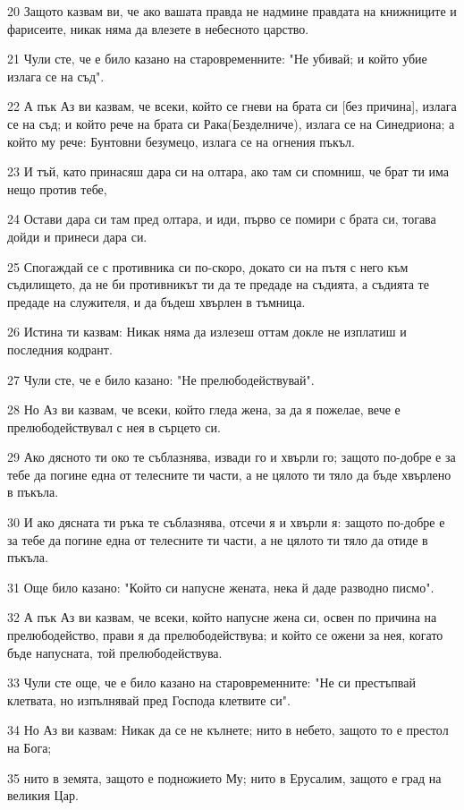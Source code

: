 \par 20 Защото казвам ви, че ако вашата правда не надмине правдата на книжниците и фарисеите, никак няма да влезете в небесното царство.
\par 21 Чули сте, че е било казано на старовременните: "Не убивай; и който убие излага се на съд".
\par 22 А пък Аз ви казвам, че всеки, който се гневи на брата си [без причина], излага се на съд; и който рече на брата си Рака(Безделниче), излага се на Синедриона; а който му рече: Бунтовни безумецо, излага се на огнения пъкъл.
\par 23 И тъй, като принасяш дара си на олтара, ако там си спомниш, че брат ти има нещо против тебе,
\par 24 Остави дара си там пред олтара, и иди, първо се помири с брата си, тогава дойди и принеси дара си.
\par 25 Спогаждай се с противника си по-скоро, докато си на пътя с него към съдилището, да не би противникът ти да те предаде на съдията, а съдията те предаде на служителя, и да бъдеш хвърлен в тъмница.
\par 26 Истина ти казвам: Никак няма да излезеш оттам докле не изплатиш и последния кодрант.
\par 27 Чули сте, че е било казано: "Не прелюбодействувай".
\par 28 Но Аз ви казвам, че всеки, който гледа жена, за да я пожелае, вече е прелюбодействувал с нея в сърцето си.
\par 29 Ако дясното ти око те съблазнява, извади го и хвърли го; защото по-добре е за тебе да погине една от телесните ти части, а не цялото ти тяло да бъде хвърлено в пъкъла.
\par 30 И ако дясната ти ръка те съблазнява, отсечи я и хвърли я: защото по-добре е за тебе да погине една от телесните ти части, а не цялото ти тяло да отиде в пъкъла.
\par 31 Още било казано: "Който си напусне жената, нека й даде разводно писмо".
\par 32 А пък Аз ви казвам, че всеки, който напусне жена си, освен по причина на прелюбодейство, прави я да прелюбодействува; и който се ожени за нея, когато бъде напусната, той прелюбодействува.
\par 33 Чули сте още, че е било казано на старовременните: "Не си престъпвай клетвата, но изпълнявай пред Господа клетвите си".
\par 34 Но Аз ви казвам: Никак да се не кълнете; нито в небето, защото то е престол на Бога;
\par 35 нито в земята, защото е подножието Му; нито в Ерусалим, защото е град на великия Цар.
